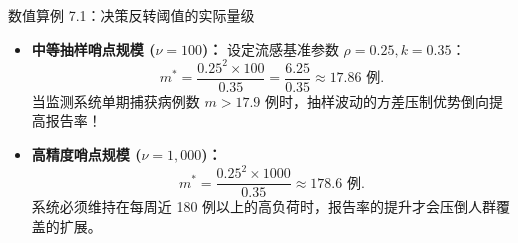 \begin{derivationbox}{数值算例 7.1：决策反转阈值的实际量级}
\begin{itemize}
  \item \textbf{中等抽样哨点规模 ($\nu = 100$)：}
  设定流感基准参数 $\rho = 0.25, k = 0.35$：
  \begin{equation}
    m^* = \frac{0.25^2 \times 100}{0.35} = \frac{6.25}{0.35} \approx 17.86 \text{ 例}.
  \end{equation}
  当监测系统单期捕获病例数 $m > 17.9$ 例时，抽样波动的方差压制优势倒向提高报告率！
  \item \textbf{高精度哨点规模 ($\nu = 1{,}000$)：}
  \begin{equation}
    m^* = \frac{0.25^2 \times 1000}{0.35} \approx 178.6 \text{ 例}.
  \end{equation}
  系统必须维持在每周近 180 例以上的高负荷时，报告率的提升才会压倒人群覆盖的扩展。
\end{itemize}
\end{derivationbox}
